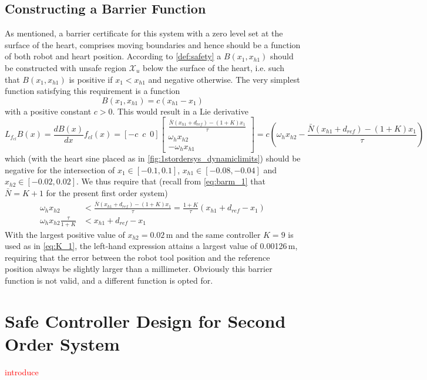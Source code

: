 \subsection{Constructing a Barrier Function}
As mentioned, a barrier certificate for this system with a zero level set at the surface of the heart, comprises moving boundaries and hence should be a function of both robot and heart position. According to \autoref{def:safety} a $B(x_1,x_{h1})$ should be constructed with unsafe region $\mathcal{X}_u$ below the surface of the heart, i.e. such that $B(x_1,x_{h1})$ is positive if $x_1<x_{h1}$ and negative otherwise. The very simplest function satisfying this requirement is a function
\begin{equation}
B(x_1,x_{h1})= c(x_{h1}-x_1)
\end{equation}
with a positive constant $c>0$. This would result in a Lie derivative 
\begin{equation}
L_{f_{cl}}B(x) = \frac{dB(x)}{dx}f_{cl}(x)=[-c\,\,\,c\,\,\,0]
\begin{bmatrix}
\frac{\bar{N}(x_{h1} + d_{ref})-(1+K) x_1}{\tau} \\
\omega_h x_{h2} \\
-\omega_h x_{h1}
\end{bmatrix}=
c\left(\omega_h x_{h2} - \frac{\bar{N}(x_{h1} + d_{ref})-(1+K) x_1}{\tau}\right)
\end{equation}
which (with the heart sine placed as in \autoref{fig:1stordersys_dynamiclimits}) should be negative for the intersection of  $x_1\in[-0.1,0.1]$, $x_{h1}\in [-0.08,-0.04]$ and $x_{h2}\in [-0.02,0.02]$. We thus require that (recall from \autoref{eq:barm_1} that $\bar{N}=K+1$ for the present first order system)
\begin{align}
\omega_h x_{h2} &< \frac{\bar{N}(x_{h1} + d_{ref})-(1+K) x_1}{\tau} = \frac{1+K}{\tau}(x_{h1} + d_{ref}-x_1)\nonumber\\
\omega_h x_{h2} \frac{\tau}{1+K} &< x_{h1} + d_{ref}-x_1
\end{align}
With the largest positive value of $x_{h2}=0.02$\,m and the same controller $K=9$ is used as in \autoref{eq:K_1}, the left-hand expression attains a largest value of 0.00126\,m, requiring that the error between the robot tool position and the reference position always be slightly larger than a millimeter. 
Obviously this barrier function is not valid, and a different function is opted for.

\section{Safe Controller Design for Second Order System}
\textcolor{red}{introduce}

